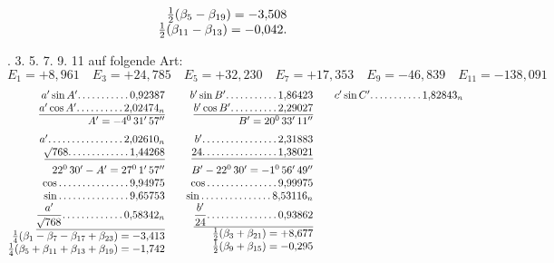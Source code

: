 \begin{landscape}
\[\begin{array}{@{}r@{\qquad}r@{\qquad}r@{}}
\begin{array}[t]{@{}r@{}}
\tfrac12(\beta_5-\beta_{19})=-3{,}508\\
\tfrac12(\beta_{11}-\beta_{13})=-0{,}042.
\end{array}
\end{array}
\]
\clearpage{}
\par{}. 3. 5. 7. 9. 11 auf folgende Art:
\[E_1=+8{,}961\quad E_3=+24{,}785\quad E_5=+32{,}230\quad E_7=+17{,}353\quad E_9=-46{,}839\quad E_{11}=-138{,}091\]
\[
\begin{array}{@{}r@{\qquad}r@{\qquad}r@{}}
\begin{array}[t]{@{}r@{}}
a'\sin A'\VfourDots{10}0{,}92387\\
\underline{a'\cos A'\VfourDots{9}2{,}02474_n}\\
A'=-4^0\,31'\,57''\\[5pt]
a'\VfourDots{15}2{,}02610_n\\
\underline{\BareRoot{768}\VfourDots{12}1{,}44268}\\[5pt]
22^0\,30'-A'=27^0\,1'\,57''\\
\cos\VfourDots{14}9{,}94975\\
\sin\VfourDots{14}9{,}65753\\
\underline{\dfrac{a'}{\BareRoot{768}}\VfourDots{12}0{,}58342_n}\\[5pt]
\tfrac14(\beta_1-\beta_7-\beta_{17}+\beta_{23})=-3{,}413\\
\tfrac14(\beta_5+\beta_{11}+\beta_{13}+\beta_{19})=-1{,}742
\end{array}
&\begin{array}[t]{@{}r@{}}
b'\sin B'\VfourDots{10}1{,}86423\\
\underline{b'\cos B'\VfourDots{9}2{,}29027}\\
B'=20^0\,33'\,11''\\[5pt]
b'\VfourDots{15}2{,}31883\\
\underline{24\VfourDots{15}1{,}38021}\\[5pt]
B'-22^0\,30'=-1^0\,56'\,49''\\
\cos\VfourDots{14}9{,}99975\\
\sin\VfourDots{14}8{,}53116_n\\
\underline{\dfrac{b'}{24}\VfourDots{14}0{,}93862}\\[5pt]
\tfrac12(\beta_3+\beta_{21})=+8{,}677\\
\tfrac12(\beta_9+\beta_{15})=-0{,}295
\end{array}
&\begin{array}[t]{@{}r@{}}
c'\sin C'\VfourDots{10}1{,}82843_n\\

\end{array}
\end{array}\]
\end{landscape}
